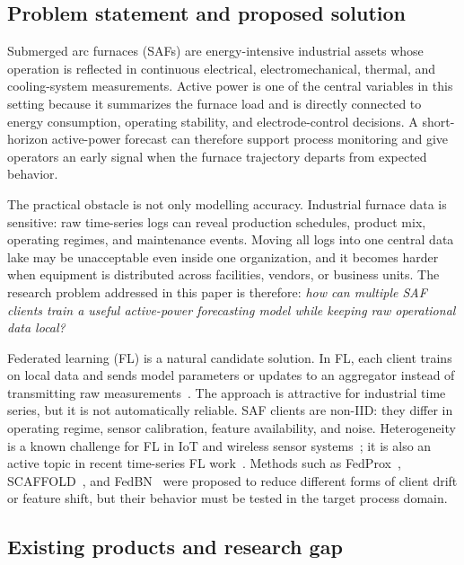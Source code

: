 \documentclass[pdflatex,sn-mathphys-num]{sn-jnl}
\theoremstyle{thmstyleone}%
\theoremstyle{thmstyletwo}%
\theoremstyle{thmstylethree}%
\begin{document}
\subsection{Problem statement and proposed solution}\label{sec:problem}

Submerged arc furnaces (SAFs) are energy-intensive industrial assets whose operation is reflected in continuous electrical, electromechanical, thermal, and cooling-system measurements. Active power is one of the central variables in this setting because it summarizes the furnace load and is directly connected to energy consumption, operating stability, and electrode-control decisions. A short-horizon active-power forecast can therefore support process monitoring and give operators an early signal when the furnace trajectory departs from expected behavior.

The practical obstacle is not only modelling accuracy. Industrial furnace data is sensitive: raw time-series logs can reveal production schedules, product mix, operating regimes, and maintenance events. Moving all logs into one central data lake may be unacceptable even inside one organization, and it becomes harder when equipment is distributed across facilities, vendors, or business units. The research problem addressed in this paper is therefore: \emph{how can multiple SAF clients train a useful active-power forecasting model while keeping raw operational data local?}

Federated learning (FL) is a natural candidate solution. In FL, each client trains on local data and sends model parameters or updates to an aggregator instead of transmitting raw measurements~\cite{mcmahan2017fedavg}. The approach is attractive for industrial time series, but it is not automatically reliable. SAF clients are non-IID: they differ in operating regime, sensor calibration, feature availability, and noise. Heterogeneity is a known challenge for FL in IoT and wireless sensor systems~\cite{mengistu2024heterogeneity}; it is also an active topic in recent time-series FL work~\cite{fedst2024,chen2025fedal}. Methods such as FedProx~\cite{li2020fedprox}, SCAFFOLD~\cite{karimireddy2020scaffold}, and FedBN~\cite{li2021fedbn} were proposed to reduce different forms of client drift or feature shift, but their behavior must be tested in the target process domain.

\subsection{Existing products and research gap}\label{sec:existing-solutions}
\end{document}
